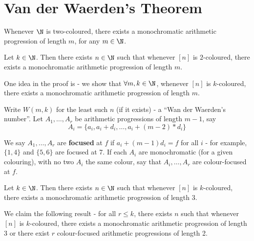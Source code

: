 
\chapter{Van der Waerden's Theorem}
\label{cha:van-der-waerdens}

\begin{thm}
  \label{defn:van_der_waerdens_theorem:1}
  Whenever $\N$ is two-coloured, there exists a monochromatic
  arithmetic progression of length $m$, for any $m \in \N$.
\end{thm}

\begin{thm}
  \label{defn:van_der_waerdens_theorem:2}
  Let $k \in \N$. Then there exists $n \in \N$ such that whenever
  $[n]$ is $2$-coloured, there exists a monochromatic arithmetic
  progression of length $m$.
\end{thm}

One idea in the proof is - we show that $\forall m, k \in \N$,
whenever $[n]$ is $k$-coloured, there exists a monochromatic
arithmetic progression of length $m$.

Write $W(m, k)$ for the least such $n$ (if it exists) - a ``Wan der
Waerden's number''.  Let $A_{1}, \dots, A_{r}$ be arithmetic
progressions of length $m-1$, say
\begin{equation}
  \label{eq:1}
  A_{i}= \{ a_{i}, a_{i} + d_{i}, \dots, a_{i}+ (m-2) * d_{i} \}
\end{equation}

We say $A_{1}, \dots, A_{r}$ are \textbf{focused} at $f$ if $a_{i} +
(m-1) d_{i} = f$ for all $i$ - for example, $\{ 1, 4\}$ and $\{ 5, 6
\}$ are focused at 7.  If each $A_{i}$ are monochromatic (for a given
colouring), with no two $A_{i}$ the same colour, say that $A_{i},
\dots, A_{r}$ are colour-focused at $f$.

\begin{proposition}
  Let $k \in \N$.  Then there exists $n \in \N$ such that whenever
  $[n]$ is $k$-coloured, there exists a monochromatic arithmetic
  progression of length 3.
\end{proposition}

\begin{lem}
  We claim the following result - for all $r \leq k$, there exists $n$
  such that whenever $[n]$ is $k$-coloured, there exists a
  monochromatic arithmetic progression of length 3 or there exist $r$
  colour-focused arithmetic progressions of length 2.
\end{lem}

